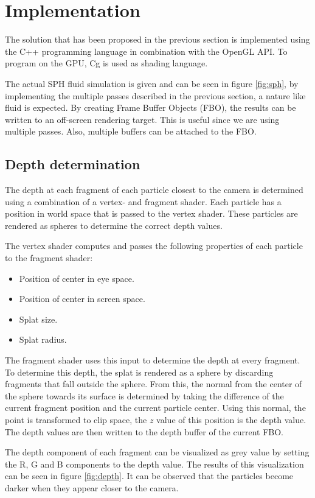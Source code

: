 \section{Implementation}
The solution that has been proposed in the previous section is implemented using the C++ programming language in combination with the OpenGL API.
To program on the GPU, Cg is used as shading language.

The actual SPH fluid simulation is given and can be seen in figure \ref{fig:sph}, by implementing the multiple passes described in the previous section, a nature like fluid is expected.
By creating Frame Buffer Objects (FBO), the results can be written to an off-screen rendering target.
This is useful since we are using multiple passes.
Also, multiple buffers can be attached to the FBO.

\subsection{Depth determination}
The depth at each fragment of each particle closest to the camera is determined using a combination of a vertex- and fragment shader.
Each particle has a position in world space that is passed to the vertex shader.
These particles are rendered as spheres to determine the correct depth values.

The vertex shader computes and passes the following properties of each particle to the fragment shader:
\begin{itemize}
 	\item Position of center in eye space.
 	\item Position of center in screen space.
 	\item Splat size.
 	\item Splat radius.
 \end{itemize} 

The fragment shader uses this input to determine the depth at every fragment.
To determine this depth, the splat is rendered as a sphere by discarding fragments that fall outside the sphere.
From this, the normal from the center of the sphere towards its surface is determined by taking the difference of the current fragment position and the current particle center.
Using this normal, the point is transformed to clip space, the $z$ value of this position is the depth value.
The depth values are then written to the depth buffer of the current FBO.

The depth component of each fragment can be visualized as grey value by setting the R, G and B components to the depth value.
The results of this visualization can be seen in figure \ref{fig:depth}.
It can be observed that the particles become darker when they appear  closer to the camera.

